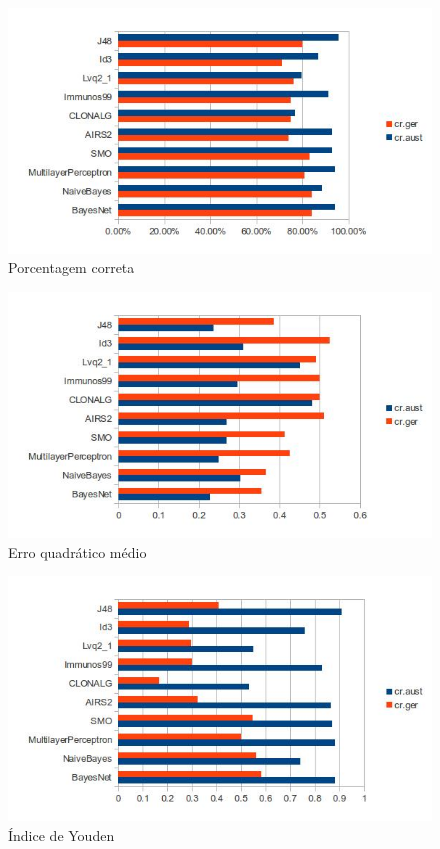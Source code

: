 \begin{figure}[h]
    \centering
    \caption{Porcentagem correta}
    \label{fig:dev_graph_correct}
    \label{fig:dev_graph_first}
    \includegraphics[width=1\textwidth]{img/graph_perc_correct.jpg}
\end{figure}

\begin{figure}[h]
    \centering
    \caption{Erro quadrático médio}
    \label{fig:dev_graph_error}
    \includegraphics[width=1\textwidth]{img/graph_error.jpg}
\end{figure}

\begin{figure}[h]
    \centering
    \caption{Índice de Youden}
    \label{fig:dev_graph_error}
    \includegraphics[width=1\textwidth]{img/graph_youden.jpg}
\end{figure}

